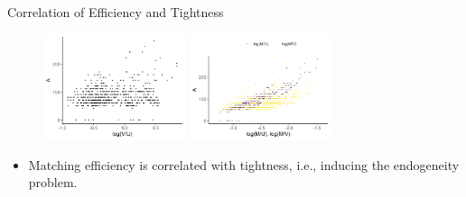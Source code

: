 \documentclass[aspectratio=169]{beamer}
\begin{document}
\begin{frame}{Correlation of Efficiency and Tightness}
    \begin{figure}[!ht]
  \begin{center}
  \includegraphics[width = 0.37\textwidth]
  {figuretable/efficiency_tightness_plot_month_aggregate.png}
  \includegraphics[width = 0.37\textwidth]
  {figuretable/job_finding_rate_efficiency_plot_month_aggregate.png}
  \end{center}
  \footnotesize
\end{figure} 
\begin{itemize}
    \item Matching efficiency is correlated with tightness, i.e., inducing the endogeneity problem.
\end{itemize}
\end{frame}
\end{document}
